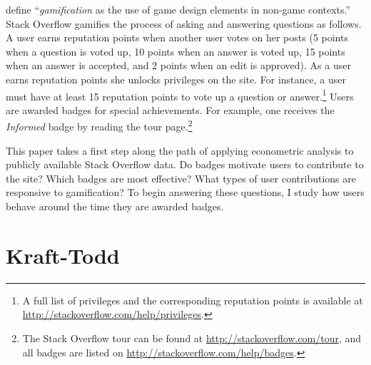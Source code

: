 \documentclass[conference]{IEEEtran}
\newcommand{\1}{\mathds{1}}
\begin{document}
\citet{Deterding2011} define ``\textit{gamification} as the use of game design elements in non-game contexts.'' Stack Overflow gamifies the process of asking and answering questions as follows. A user earns reputation points when another user votes on her posts (5 points when a question is voted up, 10 points when an answer is voted up, 15 points when an answer is accepted, and 2 points when an edit is approved). As a user earns reputation points she unlocks privileges on the site. For instance, a user must have at least 15 reputation points to vote up a question or answer.\footnote{A full list of privileges and the corresponding reputation points is available at \url{http://stackoverflow.com/help/privileges}.} Users are awarded badges for special achievements. For example, one receives the \textit{Informed} badge by reading the tour page.\footnote{The Stack Overflow tour can be found at \url{http://stackoverflow.com/tour}, and all badges are listed on \url{http://stackoverflow.com/help/badges}.}

This paper takes a first step along the path of applying econometric analysis to publicly available Stack Overflow data. Do badges motivate users to contribute to the site? Which badges are most effective? What types of user contributions are responsive to gamification? To begin answering these questions, I study how users behave around the time they are awarded badges.

\section{Kraft-Todd}
\end{document}
